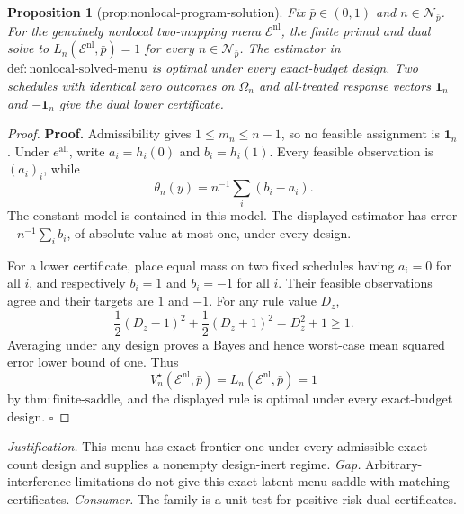 \documentclass{article}
\newtheorem{proposition}{Proposition}
\begin{document}
\begin{proposition}[prop:nonlocal-program-solution]\label{prop:nonlocal-program-solution}
Fix \(\bar p\in(0,1)\) and \(n\in\mathcal N_{\bar p}\). For the genuinely nonlocal two-mapping menu \(\mathcal E^{\mathrm{nl}}\), the finite primal and dual solve to \(L_n(\mathcal E^{\mathrm{nl}},\bar p)=1\) for every \(n\in\mathcal N_{\bar p}\). The estimator in \(\mathrm{def{:}nonlocal\text{-}solved\text{-}menu}\) is optimal under every exact-budget design. Two schedules with identical zero outcomes on \(\Omega_n\) and all-treated response vectors \(\mathbf 1_n\) and \(-\mathbf 1_n\) give the dual lower certificate.
\end{proposition}
\begin{proof}
\textbf{Proof.}
Admissibility gives \(1\le m_n\le n-1\), so no feasible assignment is \(\mathbf 1_n\). Under \(e^{\mathrm{all}}\), write \(a_i=h_i(0)\) and \(b_i=h_i(1)\). Every feasible observation is \((a_i)_i\), while
\[
 \theta_n(y)=n^{-1}\sum_i(b_i-a_i). \tag{1}
\]
The constant model is contained in this model. The displayed estimator has error \(-n^{-1}\sum_i b_i\), of absolute value at most one, under every design.

For a lower certificate, place equal mass on two fixed schedules having \(a_i=0\) for all \(i\), and respectively \(b_i=1\) and \(b_i=-1\) for all \(i\). Their feasible observations agree and their targets are \(1\) and \(-1\). For any rule value \(D_z\),
\[
 \frac12(D_z-1)^2+\frac12(D_z+1)^2=D_z^2+1\ge1.
\]
Averaging under any design proves a Bayes and hence worst-case mean squared error lower bound of one. Thus
\[
 V_n^\star(\mathcal E^{\mathrm{nl}},\bar p)
 =L_n(\mathcal E^{\mathrm{nl}},\bar p)=1
\]
by \(\mathrm{thm{:}finite\text{-}saddle}\), and the displayed rule is optimal under every exact-budget design. \(\square\)
\end{proof}
\par\smallskip\noindent \textit{Justification.} This menu has exact frontier one under every admissible exact-count design and supplies a nonempty design-inert regime. \textit{Gap.} Arbitrary-interference limitations do not give this exact latent-menu saddle with matching certificates. \textit{Consumer.} The family is a unit test for positive-risk dual certificates.
\end{document}
